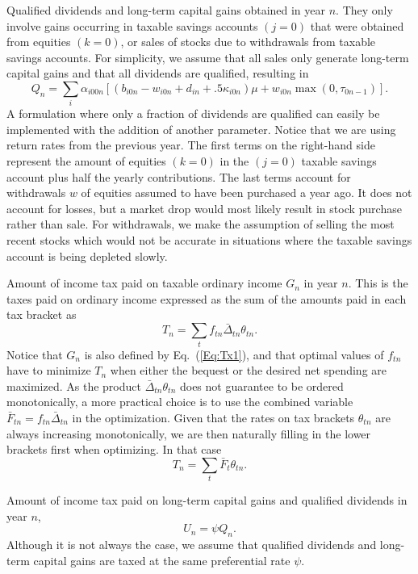 \documentclass{report}[fleqn,12pt]
\begin{document}
\begin{description}[leftmargin=4em,style=multiline]
\item [$Q_n$]
	Qualified dividends and long-term capital gains obtained in year $n$.
	They only involve gains occurring in taxable savings accounts $(j=0)$ that
	were obtained from equities $(k=0)$, or sales of stocks due to withdrawals
	from taxable savings accounts.
	For simplicity, we assume that all sales only generate long-term capital gains and
	that all dividends are qualified, resulting in
	\begin{equation}
		\label{Eq:Qx2}
		Q_n = \sum_{i} \alpha_{i00n}\left[(b_{i0n} - w_{i0n} + d_{in} + .5\kappa_{i0n})\mu +
		w_{i0n}{\max(0, \tau_{0n-1})}\right].
	\end{equation}
	A formulation where only a fraction of dividends are qualified can easily be
	implemented with the addition of another parameter.
	Notice that we are using return rates from the previous year.
	The first terms on the right-hand side represent the amount of equities $(k=0)$ in the $(j=0)$
	taxable savings account plus
	half the yearly contributions. The last terms account for withdrawals $w$ of equities assumed
	to have been purchased a year ago. 
	It does not account for losses, but a market drop
	would most likely result in stock purchase rather than sale.
	For withdrawals, we make the assumption of
	selling the most recent stocks which would not be accurate in situations where
	the taxable savings account is being depleted slowly.
\item [$T_n$]
	Amount of income tax paid on taxable ordinary income $G_n$ in year $n$.
	This is the taxes paid on ordinary income expressed as the sum of the amounts
	paid in each tax bracket as
	\begin{equation}
		\label{Eq:Tax}
		T_n = \sum_t f_{tn}\bar{\Delta}_{tn}\theta_{tn}.
	\end{equation}
	Notice that $G_n$ is also defined by Eq.~(\ref{Eq:Tx1}), and that optimal
	values of $f_{tn}$ have to
	minimize $T_n$ when either the bequest or the desired net spending are maximized.
	As the product $\bar{\Delta}_{tn}\theta_{tn}$ does not guarantee to
	be ordered monotonically, a more practical choice is to use the combined variable
	$\bar{F}_{tn} = f_{tn}\bar{\Delta}_{tn}$ in the optimization. Given that the rates on
	tax brackets $\theta_{tn}$ are always increasing monotonically, we are then naturally
	filling in the lower brackets first when optimizing. In that case
		\begin{equation}
			T_n = \sum_t \bar{F}_t \theta_{tn}.
		\end{equation}
\item [$U_n$]
	Amount of income tax paid on long-term capital gains and qualified dividends in year $n$,
	\begin{equation}
		U_n = \psi Q_n.
	\end{equation}
	Although it is not always the case, we assume that qualified dividends and long-term
	capital gains are taxed at the same preferential rate $\psi$.

\end{description}
\end{document}
